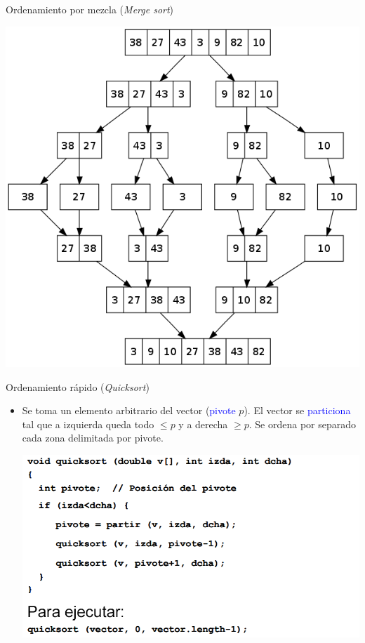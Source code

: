 \documentclass{beamer} %
\newcommand{\blue}[1]{\textcolor{blue}{#1}}
\begin{document}
\begin{frame}{Ordenamiento por mezcla ({\em Merge sort})}
    \begin{center}
        \includegraphics[width=.65\textwidth]{./image/cap5/merge-sort2.png}
    \end{center}
\end{frame}

\begin{frame}{Ordenamiento rápido ({\em Quicksort})}
    \begin{itemize}
        \item Se toma un elemento arbitrario del vector (\blue{pivote} $p$). El vector se \blue{particiona} tal que a izquierda queda todo $\leq p$ y a derecha $\geq p$. Se ordena por separado cada zona delimitada por pivote.
        \vspace{2ex}

        \begin{center}
            \includegraphics[width=.85\textwidth]{./image/cap5/quicksort1.png}
        \end{center}
    \end{itemize}
\end{frame}
\end{document}
